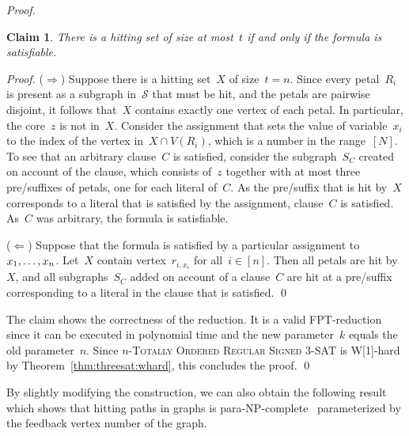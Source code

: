 \let\accentvec\vec  \documentclass{llncs}
\newtheorem{numberedclaim}{Claim}
\newcommand{\claimqed}{\renewcommand{\squareforqed}{$\lrcorner$}\qed\renewcommand{\squareforqed}{\plainsquareforqed}}
\renewcommand{\S}{\ensuremath{\mathcal{S}}\xspace}
\newcommand{\SignedThreeSatn}{\textsc{$n$-Totally Ordered Regular Signed 3-SAT}\xspace}
\begin{document}
\begin{proof}
\begin{numberedclaim} \label{claim:hitset:iff:sat}
There is a hitting set of size at most~$t$ if and only if the formula is satisfiable.
\end{numberedclaim} 
\begin{proof}
($\Rightarrow$) Suppose there is a hitting set~$X$ of size~$t = n$. Since every petal~$R_i$ is present as a subgraph in~$\S$ that must be hit, and the petals are pairwise disjoint, it follows that~$X$ contains exactly one vertex of each petal. In particular, the core~$z$ is not in~$X$. Consider the assignment that sets the value of variable~$x_i$ to the index of the vertex in~$X \cap V(R_i)$, which is a number in the range~$[N]$. To see that an arbitrary clause~$C$ is satisfied, consider the subgraph~$S_C$ created on account of the clause, which consists of~$z$ together with at most three pre/suffixes of petals, one for each literal of~$C$. As the pre/suffix that is hit by~$X$ corresponds to a literal that is satisfied by the assignment, clause~$C$ is satisfied. As~$C$ was arbitrary, the formula is satisfiable.

($\Leftarrow$) Suppose that the formula is satisfied by a particular assignment to~$x_1, \ldots, \linebreak[1] x_n$. Let~$X$ contain vertex~$r_{i, x_i}$ for all~$i \in [n]$. Then all petals are hit by~$X$, and all subgraphs~$S_C$ added on account of a clause~$C$ are hit at a pre/suffix corresponding to a literal in the clause that is satisfied.
\claimqed
\end{proof}

The claim shows the correctness of the reduction. It is a valid FPT-reduction since it can be executed in polynomial time and the new parameter~$k$ equals the old parameter~$n$. Since \SignedThreeSatn is W[1]-hard by Theorem~\ref{thm:threesat:whard}, this concludes the proof.
\qed
\end{proof}

By slightly modifying the construction, we can also obtain the following result which shows that hitting paths in graphs is para-NP-complete~\cite{FlumG06} parameterized by the feedback vertex number of the graph.
\end{document}

